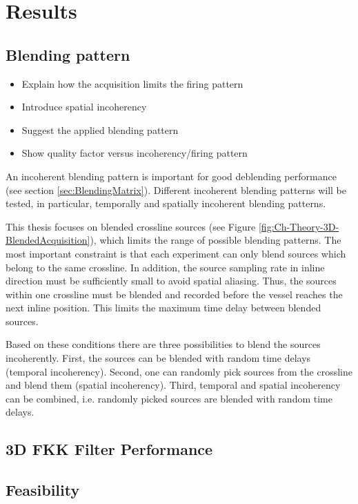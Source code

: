 \chapter{Results}

\section{Blending pattern}


\begin{itemize}
	\item Explain how the acquisition limits the firing pattern
	\item Introduce spatial incoherency
	\item Suggest the applied blending pattern
	\item Show quality factor versus incoherency/firing pattern
\end{itemize}

An incoherent blending pattern is important for good deblending performance (see section \ref{sec:BlendingMatrix}). Different incoherent blending patterns will be tested, in particular, temporally and spatially incoherent blending patterns. 

This thesis focuses on blended crossline sources (see Figure \ref{fig:Ch-Theory-3D-BlendedAcquisition}), which limits the range of possible blending patterns. The most important constraint is that each experiment can only blend sources which belong to the same crossline. In addition, the source sampling rate in inline direction must be sufficiently small to avoid spatial aliasing. Thus, the sources within one crossline must be blended and recorded before the vessel reaches the next inline position. This limits the maximum time delay between blended sources.

Based on these conditions there are three possibilities to blend the sources incoherently. First, the sources can be blended with random time delays (temporal incoherency). Second, one can randomly pick sources from the crossline and blend them (spatial incoherency). Third, temporal and spatial incoherency can be combined, i.e. randomly picked sources are blended with random time delays.


\section{3D FKK Filter Performance}

\section{Feasibility}









